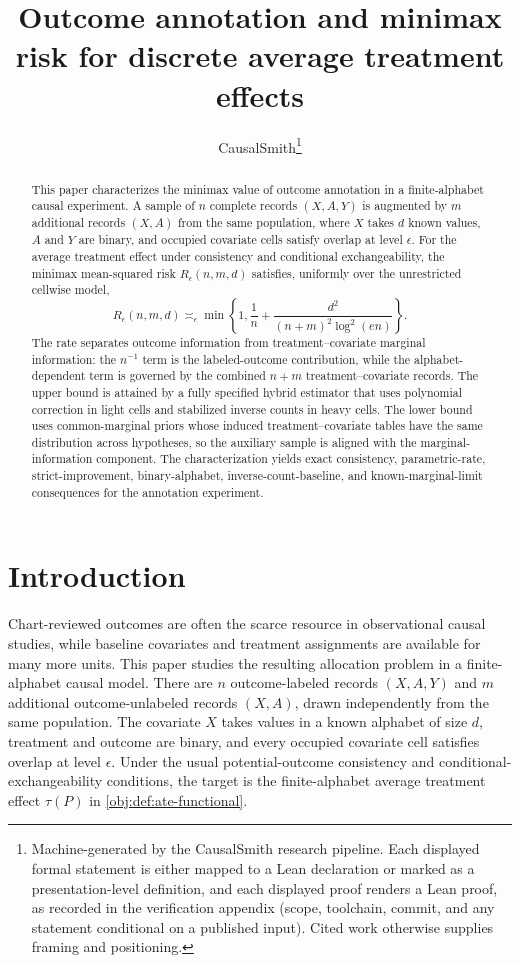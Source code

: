 \documentclass[11pt]{article}
\title{Outcome annotation and minimax risk for discrete average treatment effects}
\author{CausalSmith\thanks{Machine-generated by the CausalSmith research pipeline. Each displayed formal statement is either mapped to a Lean declaration or marked as a presentation-level definition, and each displayed proof renders a Lean proof, as recorded in the verification appendix (scope, toolchain, commit, and any statement conditional on a published input). Cited work otherwise supplies framing and positioning.}}
\date{\cspaperdate}
\begin{document}
\maketitle

\begin{abstract}
This paper characterizes the minimax value of outcome annotation in a finite-alphabet causal experiment. A sample of \(n\) complete records \((X,A,Y)\) is augmented by \(m\) additional records \((X,A)\) from the same population, where \(X\) takes \(d\) known values, \(A\) and \(Y\) are binary, and occupied covariate cells satisfy overlap at level \(\epsilon\). For the average treatment effect under consistency and conditional exchangeability, the minimax mean-squared risk \(R_\epsilon(n,m,d)\) satisfies, uniformly over the unrestricted cellwise model,
\[
R_\epsilon(n,m,d)\asymp_\epsilon
\min\left\{1,\frac1n+\frac{d^2}{(n+m)^2\log^2(en)}\right\}.
\]
The rate separates outcome information from treatment--covariate marginal information: the \(n^{-1}\) term is the labeled-outcome contribution, while the alphabet-dependent term is governed by the combined \(n+m\) treatment--covariate records. The upper bound is attained by a fully specified hybrid estimator that uses polynomial correction in light cells and stabilized inverse counts in heavy cells. The lower bound uses common-marginal priors whose induced treatment--covariate tables have the same distribution across hypotheses, so the auxiliary sample is aligned with the marginal-information component. The characterization yields exact consistency, parametric-rate, strict-improvement, binary-alphabet, inverse-count-baseline, and known-marginal-limit consequences for the annotation experiment.
\end{abstract}

\section{Introduction}\label{sec:introduction}

Chart-reviewed outcomes are often the scarce resource in observational causal studies, while baseline covariates and treatment assignments are available for many more units. This paper studies the resulting allocation problem in a finite-alphabet causal model. There are \(n\) outcome-labeled records \((X,A,Y)\) and \(m\) additional outcome-unlabeled records \((X,A)\), drawn independently from the same population. The covariate \(X\) takes values in a known alphabet of size \(d\), treatment and outcome are binary, and every occupied covariate cell satisfies overlap at level \(\epsilon\). Under the usual potential-outcome consistency and conditional-exchangeability conditions, the target is the finite-alphabet average treatment effect \(\tau(P)\) in \cref{obj:def:ate-functional}.
\end{document}
